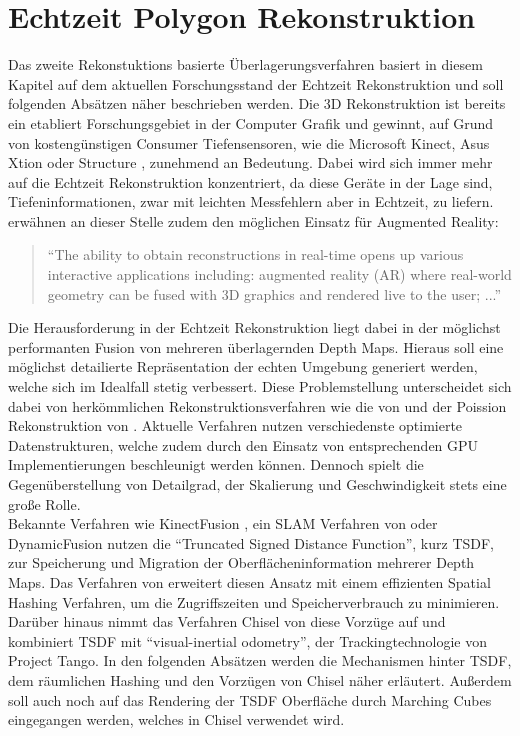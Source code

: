 \section{Echtzeit Polygon Rekonstruktion} \label{sec:polygon_reconstruction}

Das zweite Rekonstuktions basierte Überlagerungsverfahren basiert in diesem Kapitel auf dem aktuellen Forschungsstand der Echtzeit Rekonstruktion und soll folgenden Absätzen näher beschrieben werden. Die 3D Rekonstruktion ist bereits ein etabliert Forschungsgebiet in der Computer Grafik und gewinnt, auf Grund von kostengünstigen Consumer Tiefensensoren, wie die Microsoft Kinect, Asus Xtion oder Structure \citep{Struc48:online}, zunehmend an Bedeutung. Dabei wird sich immer mehr auf die Echtzeit Rekonstruktion konzentriert, da diese Geräte in der Lage sind, Tiefeninformationen, zwar mit leichten Messfehlern aber in Echtzeit, zu liefern. \citet{niessner2013real} erwähnen an dieser Stelle zudem den möglichen Einsatz für Augmented Reality:

\begin{quote}
\enquote{The ability to obtain reconstructions
in real-time opens up various interactive applications including:
augmented reality (AR) where real-world geometry can be fused
with 3D graphics and rendered live to the user; ...} \citep{niessner2013real}
\end{quote}

Die Herausforderung in der Echtzeit Rekonstruktion liegt dabei in der möglichst performanten Fusion von mehreren überlagernden Depth Maps. Hieraus soll eine möglichst detailierte Repräsentation der echten Umgebung generiert werden, welche sich im Idealfall stetig verbessert. Diese Problemstellung unterscheidet sich dabei von herkömmlichen Rekonstruktionsverfahren wie die von \citet{hoppe1992surface} und der Poission Rekonstruktion von \citet{kazhdan2006poisson}. Aktuelle Verfahren nutzen verschiedenste optimierte Datenstrukturen, welche zudem durch den Einsatz von entsprechenden GPU Implementierungen beschleunigt werden können. Dennoch spielt die Gegenüberstellung von Detailgrad, der Skalierung und Geschwindigkeit stets eine große Rolle. \citet{niessner2013real} \\

Bekannte Verfahren wie KinectFusion \citep{newcombe2011kinectfusion}, ein SLAM Verfahren von \citet{bylow2013real} oder DynamicFusion \citep{newcombe2015dynamicfusion} nutzen die \enquote{Truncated Signed Distance Function}, kurz TSDF, zur Speicherung und Migration der Oberflächeninformation mehrerer Depth Maps. Das Verfahren von \citet{niessner2013real} erweitert diesen Ansatz mit einem effizienten Spatial Hashing Verfahren, um die Zugriffszeiten und Speicherverbrauch zu minimieren. Darüber hinaus nimmt das Verfahren Chisel von \citep{Klingensmith_2015_7924} diese Vorzüge auf und kombiniert TSDF mit \enquote{visual-inertial odometry}, der Trackingtechnologie von Project Tango. In den folgenden Absätzen werden die Mechanismen hinter TSDF, dem räumlichen Hashing und den Vorzügen von Chisel näher erläutert. Außerdem soll auch noch auf das Rendering der TSDF Oberfläche durch Marching Cubes eingegangen werden, welches in Chisel verwendet wird. \\


